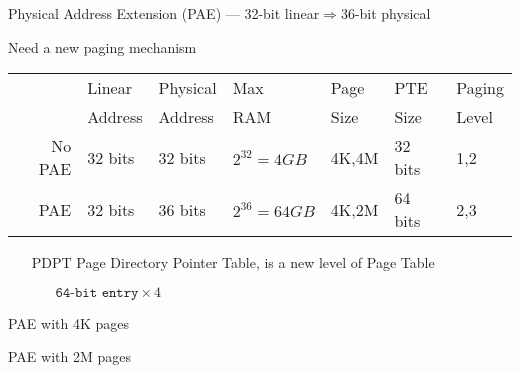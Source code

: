 \begin{frame}{Physical Address Extension (PAE)}
  { --- 32-bit linear$\Rightarrow{}$36-bit physical}
  \begin{block}{Need a new paging mechanism}
    \begin{scriptsize}
      \begin{center}
        \begin{tabular}{r|llllll}
          &Linear&Physical&Max&Page&PTE&Paging\\
          &Address&Address&RAM&Size&Size&Level\\\hline
          No PAE&32 bits&32 bits&$2^{32}=4GB$&4K,4M&32 bits&1,2\\
          PAE&32 bits&36 bits&$2^{36}=64GB$&4K,2M&64 bits&2,3
        \end{tabular}
      \end{center}
    \end{scriptsize}
  \end{block}
  \vspace{1em}
  \begin{varwidth}{.49\textwidth}
    \begin{itemize}
    \item[PDPT] Page Directory Pointer Table, is a new level of Page Table
      \begin{itemize}
      \item[] $\texttt{64-bit entry}\times{}4$
      \end{itemize}
    \end{itemize}
  \end{varwidth}\hfill
  \begin{varwidth}{.49\textwidth}
    \begin{center}
       
    \end{center}
  \end{varwidth}
\end{frame}

\begin{frame}{PAE with 4K pages}
  \begin{center}
     
  \end{center}
\end{frame}

\begin{frame}{PAE with 2M pages}
  \begin{center}
     
  \end{center}
\end{frame}

